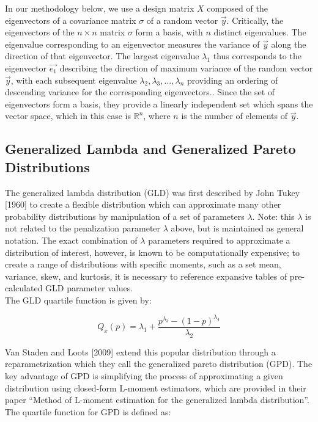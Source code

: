 \documentclass[12pt]{article}
\begin{document}
In our methodology below, we use a design matrix $X$ composed of the eigenvectors of a covariance matrix $\sigma$ of a random vector $\vec{y}$. Critically, the eigenvectors of the $n \times n$ matrix $\sigma$ form a basis, with $n$ distinct eigenvalues. The eigenvalue corresponding to an eigenvector measures the variance of $\vec{y}$ along the direction of that eigenvector. The largest eigenvalue $\lambda_1$ thus corresponds to the eigenvector $\vec{e_1}$ describing the direction of maximum variance of the random vector $\vec{y}$, with each subsequent eigenvalue $\lambda_2,\lambda_3, ... ,\lambda_n$ providing an ordering of descending variance for the corresponding eigenvectors.. Since the set of eigenvectors form a basis, they provide a linearly independent set which spans the vector space, which in this case is $\mathbb{R}^n$, where $n$ is the number of elements of $\vec{y}$.

\subsection{Generalized Lambda and Generalized Pareto Distributions}\label{subsec6}

The generalized lambda distribution (GLD) was first described by John Tukey [1960] to create a flexible distribution which can approximate many other probability distributions by manipulation of a set of parameters $\lambda$. Note: this $\lambda$ is not related to the penalization parameter $\lambda$ above, but is maintained as general notation. The exact combination of $\lambda$ parameters required to approximate a distribution of interest, however, is known to be computationally expensive; to create a range of distributions with specific moments, such as a set mean, variance, skew, and kurtosis, it is necessary to reference expansive tables of pre-calculated GLD parameter values. \\

The GLD quartile function is given by:

\begin{equation}
Q_x(p)=\lambda_1+\frac{p^{\lambda_3}-(1-p)^{\lambda_4}}{\lambda_2}\label{eq9}
\end{equation}

Van Staden and Loots [2009] extend this popular distribution through a reparametrization which they call the generalized pareto distribution (GPD). The key advantage of GPD is simplifying the process of approximating a given distribution using closed-form L-moment estimators, which are provided in their paper ``Method of L-moment estimation for the generalized lambda distribution''. The quartile function for GPD is defined as:
\end{document}
